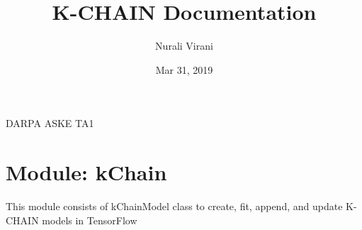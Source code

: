 \documentclass[letterpaper,10pt,english]{sphinxmanual}
\title{K-CHAIN Documentation}
\date{Mar 31, 2019}
\author{Nurali Virani}
\begin{document}
\pagestyle{empty}
\maketitle
\pagestyle{plain}
\sphinxtableofcontents
\pagestyle{normal}
\label{\detokenize{index::doc}}


DARPA ASKE TA1


\chapter{Module: kChain}
\label{\detokenize{index:module-kChain}}\label{\detokenize{index:module-kchain}}
This module consists of kChainModel class to create, fit, append, and update
K-CHAIN models in TensorFlow
\end{document}
